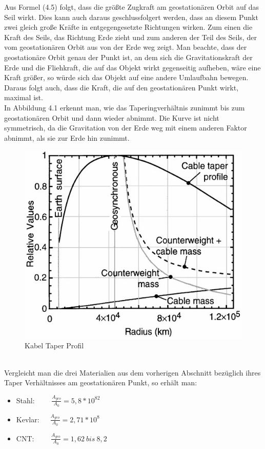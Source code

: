 \documentclass[a4paper, 10pt]{report}
\begin{document}
Aus Formel (4.5) folgt, dass die größte Zugkraft am geostationären Orbit auf das Seil wirkt. Dies kann auch daraus geschlussfolgert werden, dass an diesem Punkt zwei gleich große Kräfte in entgegengesetzte Richtungen wirken. Zum einen die Kraft des Seils, das Richtung Erde zieht und zum anderen der Teil des Seils, der vom geostationären Orbit aus von der Erde weg zeigt. Man beachte, dass der geostationäre Orbit genau der Punkt ist, an dem sich die Gravitationskraft der Erde und die Fliehkraft, die auf das Objekt wirkt gegenseitig aufheben, wäre eine Kraft größer, so würde sich das Objekt auf eine andere Umlaufbahn bewegen. Daraus folgt auch, dass die Kraft, die auf den geostationären Punkt wirkt, maximal ist. \\
In Abbildung 4.1 erkennt man, wie das Taperingverhältnis zunimmt bis zum geostationären Orbit und dann wieder abnimmt. Die Kurve ist nicht symmetrisch, da die Gravitation von der Erde weg mit einem anderen Faktor abnimmt, als sie zur Erde hin zunimmt.
\begin{figure}[h]
\centering
\includegraphics[scale=0.4]{Tapering.png} 
\caption{Kabel Taper Profil}
	\label{Abb:Tapering}
\end{figure}
\\
Vergleicht man die drei Materialien aus dem vorherigen Abschnitt bezüglich ihres Taper Verhältnisses am geostationären Punkt, so erhält man:

\begin{itemize}
\item Stahl: \ \ \ \ $\frac{A_{geo}}{A_0} = 5,8 *10^82$
\item Kevlar:\ \ \   $\frac{A_{geo}}{A_0} = 2,71 *10^8$
\item CNT: \ \ \ \ $\frac{A_{geo}}{A_0} = 1,62\ bis\ 8,2 $ 
\end{itemize}
\end{document}
